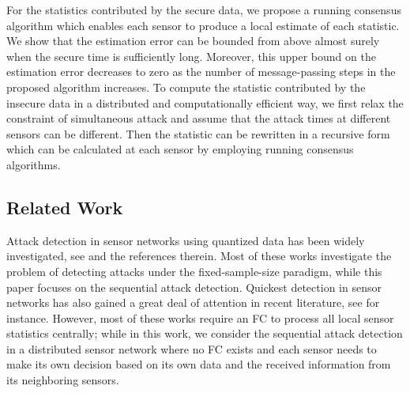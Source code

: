 \documentclass[11pt, draftclsnofoot, onecolumn]{IEEEtran}
\begin{document}
For the statistics contributed by the secure data, we propose a running consensus algorithm which enables each sensor to produce a local estimate of each statistic. We show that the estimation error can be bounded from above almost surely when the secure time is sufficiently long. Moreover, this upper bound on the estimation error decreases to   zero   as the number of message-passing   steps   in the proposed algorithm increases. To compute the statistic contributed by the insecure data in a distributed and computationally efficient way, we first relax the constraint   of   simultaneous attack and   assume   that the attack times at   different  sensors   can be   different.   Then   the statistic can be rewritten in a recursive form which can be calculated at each sensor by employing running consensus algorithms. 

 
\subsection{Related Work}

  Attack   detection in sensor networks using quantized data has been widely
investigated, see \cite{li2005robust, cui2012coordinated, vempaty2013distributed, nadendla2014distributed, zhang2015Asymptotically, alnajjab2015attacks, zhang2017functional, zhang2017attack} and the references therein.  Most of these works investigate the problem of detecting attacks    under   the fixed-sample-size paradigm, while this paper focuses on the sequential attack detection.    Quickest   detection in sensor networks has also gained a great deal of attention in recent literature, see \cite{veeravalli2001decentralized, mei2008asymptotic, tartakovsky2008asymptotically,  hadjiliadis2009one, raghavan2010quickest, fellouris2016second, huang2011defending, xie2013sequential,  li2015quickest,  liu2017distributed} for instance. However, most of these works require an FC to process all   local sensor   statistics centrally; while in this work, we consider the sequential attack detection in  a distributed sensor network where no FC exists and each sensor needs to make its own decision based on its own   data   and the received information from its neighboring sensors.
\end{document}

